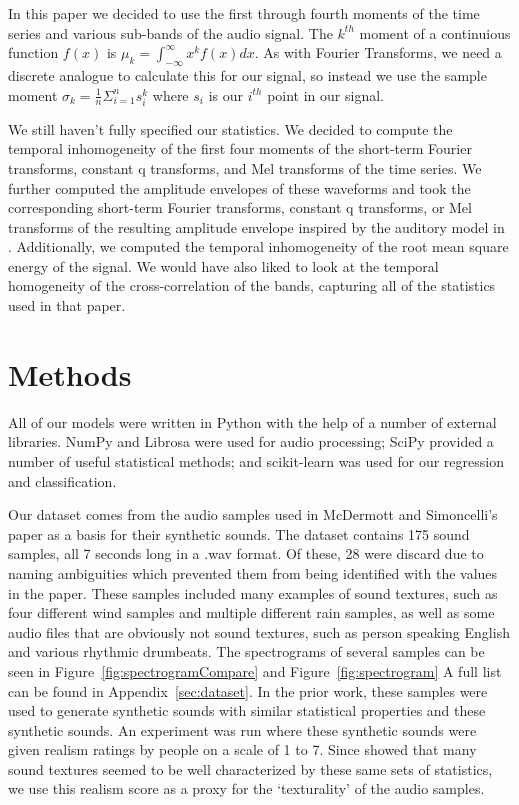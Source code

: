 \documentclass{sig-alternate-05-2015}
\begin{document}
In this paper we decided to use the first through fourth moments of the time series and various sub-bands of the audio signal. The $k^{th}$ moment of a continuious function $f(x)$ is $\mu_k = \int_{-\infty}^\infty x^kf(x)dx$. As with Fourier Transforms, we need a discrete analogue to calculate this for our signal, so instead we use the sample moment $\sigma_k = \frac{1}{n} \Sigma^n_{i=1} s_i^k$ where $s_i$ is our $i^{th}$ point in our signal.

We still haven't fully specified our statistics. We decided to compute the temporal inhomogeneity of the first four moments of the short-term Fourier transforms, constant q transforms, and Mel transforms of the time series. We further computed the amplitude envelopes of these waveforms and took the corresponding short-term Fourier transforms, constant q transforms, or Mel transforms of the resulting amplitude envelope inspired by the auditory model in \cite{McDermott2011926, mcdermott2013summary}. Additionally, we computed the temporal inhomogeneity of the root mean square energy of the signal. We would have also liked to look at the temporal homogeneity of the cross-correlation of the bands, capturing all of the statistics used in that paper.

\section{Methods}
\label{sec:methods}

All of our models were written in Python with the help of a number of external libraries. NumPy\cite{numpy} and Librosa\cite{mcfee2015librosa} were used for audio processing; SciPy\cite{scipy} provided a number of useful statistical methods; and scikit-learn\cite{scikit-learn} was used for our regression and classification.

Our dataset comes from the audio samples used in McDermott and Simoncelli's paper\cite{McDermott2011926} as a basis for their synthetic sounds. The dataset contains 175 sound samples, all 7 seconds long in a .wav format. Of these, 28 were discard due to naming ambiguities which prevented them from being identified with the values in the paper. These samples included many examples of sound textures, such as four different wind samples and multiple different rain samples, as well as some audio files that are obviously not sound textures, such as person speaking English and various rhythmic drumbeats. The spectrograms of several samples can be seen in Figure~\ref{fig:spectrogramCompare} and Figure~\ref{fig:spectrogram} A full list can be found in Appendix~\ref{sec:dataset}. In the prior work, these samples were used to generate synthetic sounds with similar statistical properties and these synthetic sounds. An experiment was run where these synthetic sounds were given realism ratings by people on a scale of 1 to 7. Since \cite{mcdermott2013summary} showed that many sound textures seemed to be well characterized by these same sets of statistics, we use this realism score as a proxy for the `texturality' of the audio samples.
\end{document}
